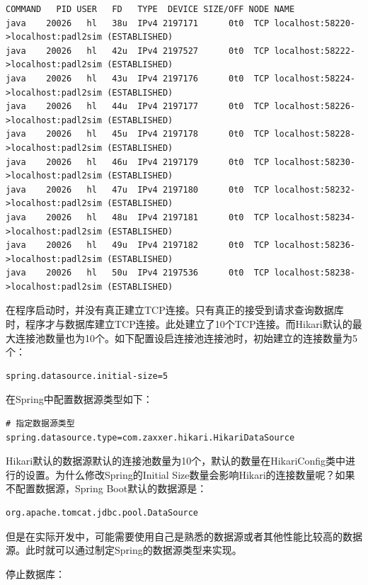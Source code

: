 \documentclass[letter]{book}
\begin{document}
\begin{lstlisting}
COMMAND   PID USER   FD   TYPE  DEVICE SIZE/OFF NODE NAME
java    20026   hl   38u  IPv4 2197171      0t0  TCP localhost:58220->localhost:padl2sim (ESTABLISHED)
java    20026   hl   42u  IPv4 2197527      0t0  TCP localhost:58222->localhost:padl2sim (ESTABLISHED)
java    20026   hl   43u  IPv4 2197176      0t0  TCP localhost:58224->localhost:padl2sim (ESTABLISHED)
java    20026   hl   44u  IPv4 2197177      0t0  TCP localhost:58226->localhost:padl2sim (ESTABLISHED)
java    20026   hl   45u  IPv4 2197178      0t0  TCP localhost:58228->localhost:padl2sim (ESTABLISHED)
java    20026   hl   46u  IPv4 2197179      0t0  TCP localhost:58230->localhost:padl2sim (ESTABLISHED)
java    20026   hl   47u  IPv4 2197180      0t0  TCP localhost:58232->localhost:padl2sim (ESTABLISHED)
java    20026   hl   48u  IPv4 2197181      0t0  TCP localhost:58234->localhost:padl2sim (ESTABLISHED)
java    20026   hl   49u  IPv4 2197182      0t0  TCP localhost:58236->localhost:padl2sim (ESTABLISHED)
java    20026   hl   50u  IPv4 2197536      0t0  TCP localhost:58238->localhost:padl2sim (ESTABLISHED)
\end{lstlisting}

在程序启动时，并没有真正建立TCP连接。只有真正的接受到请求查询数据库时，程序才与数据库建立TCP连接。此处建立了10个TCP连接。而Hikari默认的最大连接池数量也为10个。如下配置设启连接池连接池时，初始建立的连接数量为5个：

\begin{lstlisting}
spring.datasource.initial-size=5
\end{lstlisting}

在Spring中配置数据源类型如下：

\begin{lstlisting}
# 指定数据源类型
spring.datasource.type=com.zaxxer.hikari.HikariDataSource
\end{lstlisting}

Hikari默认的数据源默认的连接池数量为10个，默认的数量在HikariConfig类中进行的设置。为什么修改Spring的Initial Size数量会影响Hikari的连接数量呢？如果不配置数据源，Spring Boot默认的数据源是：

\begin{lstlisting}
org.apache.tomcat.jdbc.pool.DataSource
\end{lstlisting}

但是在实际开发中，可能需要使用自己是熟悉的数据源或者其他性能比较高的数据源。此时就可以通过制定Spring的数据源类型来实现。

停止数据库：
\end{document}
